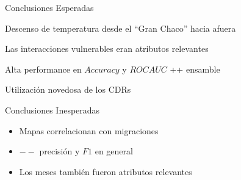 \documentclass[xcolor=x11names]{beamer}
\begin{document}



\begin{frame}{Conclusiones Esperadas}

	Descenso de temperatura desde el ``Gran Chaco'' hacia afuera

	\medskip
	Las interacciones vulnerables eran atributos relevantes 

	\medskip
	Alta performance en $Accuracy$ y $ROC AUC$ 	++ ensamble

	\medskip

	Utilización novedosa de los CDRs 

\end{frame}


\begin{frame}{Conclusiones Inesperadas}

	\begin{itemize}[]
		\item Mapas correlacionan con migraciones 
		\item $--$ precisión y $F1$ en general
		\item Los meses también fueron atributos relevantes	
		
	\end{itemize}
	
	


\end{frame}
\end{document}

